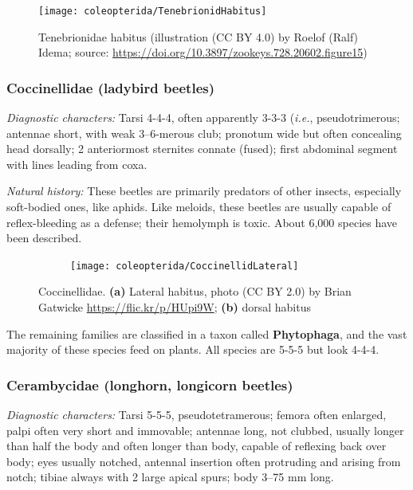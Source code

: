\begin{figure}[ht!]
  \centering
    \texttt{[image: coleopterida/TenebrionidHabitus]}
  \caption{Tenebrionidae habitus (illustration (CC BY 4.0) by Roelof (Ralf) Idema; source: \url{https://doi.org/10.3897/zookeys.728.20602.figure15})}
  \label{fig:tenebrionids}
\end{figure}

\subsubsection{Coccinellidae (ladybird beetles)}
\noindent{}\textit{Diagnostic characters:} Tarsi 4-4-4, often apparently 3-3-3 (\textit{i.e.}, pseudotrimerous; antennae short, with weak 3--6-merous club; pronotum wide but often concealing head dorsally; 2 anteriormost sternites connate (fused); first abdominal segment with lines leading from coxa.\vspace{3mm}

\noindent{}\textit{Natural history:} These beetles are primarily predators of other insects, especially soft-bodied ones, like aphids. Like meloids, these beetles are usually capable of reflex-bleeding as a defense; their hemolymph is toxic. About 6,000 species have been described.

\begin{figure}[ht!]
  \centering
\begin{subfigure}[ht!]{0.42\textwidth}
    \texttt{[image: coleopterida/CoccinellidLateral]}
  \caption{}%
  \label{fig:coccinellid1}
\end{subfigure}
    \qquad
\begin{subfigure}[ht!]{0.39\textwidth}
  \caption{}
  \label{fig:coccinellid2}
\end{subfigure}
    \caption{Coccinellidae. \textbf{(a)} Lateral habitus, photo (CC BY 2.0) by Brian Gatwicke \url{https://flic.kr/p/HUpi9W}; \textbf{(b)} dorsal habitus \citep[modified from][Plate 10, Fig. 6]{bhlitem112390}}\label{fig:coccinellids}
\end{figure}

\noindent{}The remaining families are classified in a taxon called \textbf{Phytophaga}, and the vast majority of these species feed on plants. All species are 5-5-5 but look 4-4-4. 

\subsubsection{Cerambycidae (longhorn, longicorn beetles)}
\noindent{}\textit{Diagnostic characters:} Tarsi 5-5-5, pseudotetramerous; femora often enlarged, palpi often very short and immovable; antennae long, not clubbed, usually longer than half the body and often longer than body, capable of reflexing back over body; eyes usually notched, antennal insertion often protruding and arising from notch; tibiae always with 2 large apical spurs; body 3--75 mm long.\vspace{3mm}

